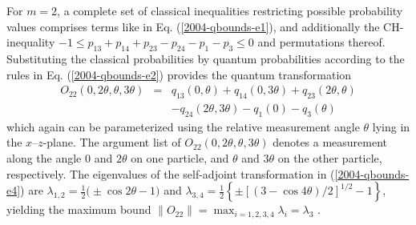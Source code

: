 \documentclass[prl,showpacs,showkeys,amsfonts,amsmath,twocolumn]{revtex4}
\begin{document}
For $m=2$, a complete
set of classical inequalities restricting possible probability values comprises terms
like in Eq. (\ref{2004-qbounds-e1}),
and additionally the CH-inequality
$-1 \leq p_{13} + p_{14} + p_{23} - p_{24}- p_{1} -p_{3} \leq 0$ and permutations thereof.
Substituting
the classical probabilities by quantum probabilities according to the
rules in Eq. (\ref{2004-qbounds-e2}) provides the quantum
transformation
\begin{eqnarray}
O_{22}(0,2\theta,\theta,3\theta)&=&  q_{13}(0,\theta) +
q_{14}(0,3\theta) + q_{23}(2\theta,\theta) \nonumber\\
&&  - q_{24}(2\theta,3\theta)- q_{1}(0) - q_{3}(\theta)
\label{2004-qbounds-e4}
\end{eqnarray}
which again can be parameterized using the relative measurement angle $\theta$ lying in
the $x$--$z$-plane. The argument list of
$O_{22}(0,2\theta,\theta,3\theta)$ denotes  a measurement
along the angle $0$ and $2\theta$ on one particle, and $\theta$ and
$3\theta$ on the other particle, respectively.
The eigenvalues of the self-adjoint transformation in
(\ref{2004-qbounds-e4})
are $\lambda_{1,2} = \frac{1}{2}\big(\pm \cos 2\theta -
1\big)$ and $\lambda_{3,4} = \frac{1}{2}\left\{\pm\left[ \left(3-\cos 4\theta \right)/2\right]^{1/2} -1\right\}$,
yielding the maximum bound $\|
O_{22} \|= \max_{i=1,2,3,4} \lambda_i =\lambda_3 $ \cite{cabello-2003a,filipp-svo-04-qpoly}.
\end{document}
